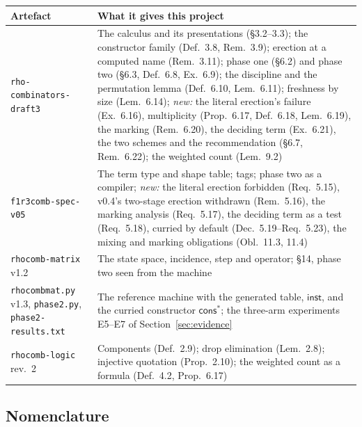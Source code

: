 \documentclass[11pt,a4paper]{article}
\newcommand{\code}[1]{\texttt{#1}}
\theoremstyle{definition}
\theoremstyle{plain}
\newcommand{\inst}{\mathsf{inst}}
\newcommand{\cstar}{\mathsf{cons}^{*}}
\begin{document}
\begin{center}
\begin{tabularx}{\linewidth}{@{}l>{\raggedright\arraybackslash}X@{}}
\toprule
Artefact & What it gives this project\\
\midrule
\code{rho-combinators-draft3} & The calculus and its presentations
(\S3.2--3.3); the constructor family (Def.~3.8, Rem.~3.9); erection at a
computed name (Rem.~3.11); phase one (\S6.2) and phase two (\S6.3, Def.~6.8,
Ex.~6.9); the discipline and the permutation lemma (Def.~6.10, Lem.~6.11);
freshness by size (Lem.~6.14); \emph{new:} the literal erection's failure
(Ex.~6.16), multiplicity (Prop.~6.17, Def.~6.18, Lem.~6.19), the marking
(Rem.~6.20), the deciding term (Ex.~6.21), the two schemes and the
recommendation (\S6.7, Rem.~6.22); the weighted count (Lem.~9.2)\\
\code{f1r3comb-spec-v05} & The term type and shape table; tags; phase two as
a compiler; \emph{new:} the literal erection forbidden (Req.~5.15), v0.4's
two-stage erection withdrawn (Rem.~5.16), the marking analysis (Req.~5.17),
the deciding term as a test (Req.~5.18), curried by default
(Dec.~5.19--Req.~5.23), the mixing and marking obligations (Obl.~11.3,
11.4)\\
\code{rhocomb-matrix} v1.2 & The state space, incidence, step and operator;
\S14, phase two seen from the machine\\
\code{rhocombmat.py} v1.3, \code{phase2.py}, \code{phase2-results.txt} & The
reference machine with the generated table, $\inst$, and the curried
constructor $\cstar$; the three-arm experiments E5--E7 of
Section~\ref{sec:evidence}\\
\code{rhocomb-logic} rev.~2 & Components (Def.~2.9); drop elimination
(Lem.~2.8); injective quotation (Prop.~2.10); the weighted count as a formula
(Def.~4.2, Prop.~6.17)\\
\bottomrule
\end{tabularx}
\end{center}

\subsection{Nomenclature}\label{sec:nomen}
\end{document}
